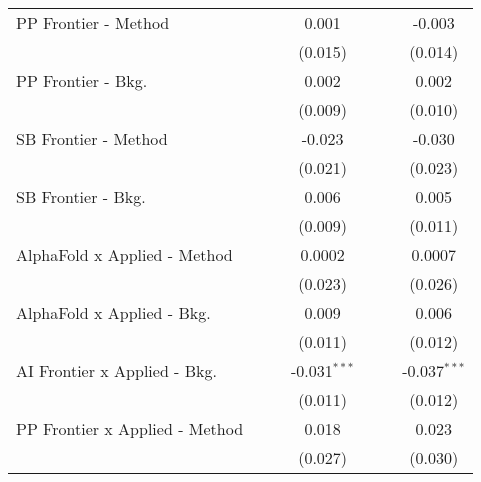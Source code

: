\begin{tabular}{lcccccc}
   PP Frontier - Method           &              &              & 0.001          &                &             & -0.003\\   
                                  &              &              & (0.015)        &                &             & (0.014)\\   
   PP Frontier - Bkg.             &              &              & 0.002          &                &             & 0.002\\   
                                  &              &              & (0.009)        &                &             & (0.010)\\   
   SB Frontier - Method           &              &              & -0.023         &                &             & -0.030\\   
                                  &              &              & (0.021)        &                &             & (0.023)\\   
   SB Frontier - Bkg.             &              &              & 0.006          &                &             & 0.005\\   
                                  &              &              & (0.009)        &                &             & (0.011)\\   
   AlphaFold x Applied - Method   &              &              & 0.0002         &                &             & 0.0007\\   
                                  &              &              & (0.023)        &                &             & (0.026)\\   
   AlphaFold x Applied - Bkg.     &              &              & 0.009          &                &             & 0.006\\   
                                  &              &              & (0.011)        &                &             & (0.012)\\   
   AI Frontier x Applied - Bkg.   &              &              & -0.031$^{***}$ &                &             & -0.037$^{***}$\\   
                                  &              &              & (0.011)        &                &             & (0.012)\\   
   PP Frontier x Applied - Method &              &              & 0.018          &                &             & 0.023\\   
                                  &              &              & (0.027)        &                &             & (0.030)\\   

\end{tabular}
